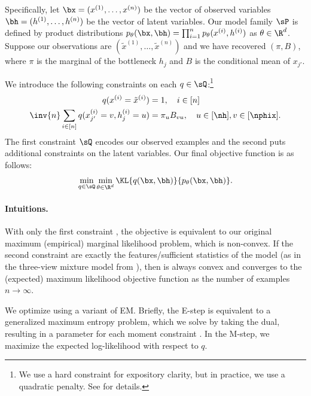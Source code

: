Specifically,
let $\bx = (x^{(1)}, \dots, x^{(n)})$ be the vector of observed variables
$\bh = (h^{(1)}, \dots, h^{(n)})$ be the vector of latent variables.
Our model family $\sP$ is defined by product distributions
$p_\theta(\bx,\bh) = \prod_{i=1}^n p_\theta(x^{(i)}, h^{(i)})$ as $\theta \in \R^d$.
Suppose our observations are $(\tilde x^{(1)}, \dots, \tilde x^{(n)})$
and we have recovered $(\pi,B)$, where $\pi$ is the marginal of the bottleneck $h_j$ and $B$ is the conditional mean of $x_{j'}$.

We introduce the following constraints on each $q \in \sQ$:\footnote{We use a hard constraint
for expository clarity, but in practice, we use a quadratic penalty.  See
\citet{liang09measurements} for details.}
\begin{align}
  q(x^{(i)} = \tilde x^{(i)}) &= 1, \quad i \in [n] \label{eqn:exConstraint} \\
  \inv{n} \sum_{i \in [n]} q(x_{j'}^{(i)} = v, h_j^{(i)} = u) &= \pi_u B_{v u}, \quad u \in [\nh], v \in [\nphix]. \label{eqn:momentConstraint}
\end{align}
The first constraint $\sQ$ encodes our observed examples
and the second puts additional constraints on the latent variables.
Our final objective function is as follows:
\begin{align}
  \min_{q \in \sQ} \min_{\theta \in \R^d} \KL{q(\bx, \bh)}{p_\theta(\bx, \bh)}. \label{eqn:minKL}
\end{align}
\paragraph{Intuitions.}
With only the first constraint , the objective
 is equivalent to our original maximum (empirical) marginal
likelihood problem, which is non-convex.  If the second constraint
 are exactly the features/sufficient statistics of the
model (as in the three-view mixture model from ),
then  is always convex and
converges to the (expected) maximum likelihood objective function as the number of examples $n \to\infty$.

We optimize  using a variant of EM.
Briefly, the E-step is equivalent to a generalized maximum entropy problem,
which we solve by taking the dual, resulting in a parameter for each moment constraint .
In the M-step, we maximize the expected log-likelihood with respect to $q$.

